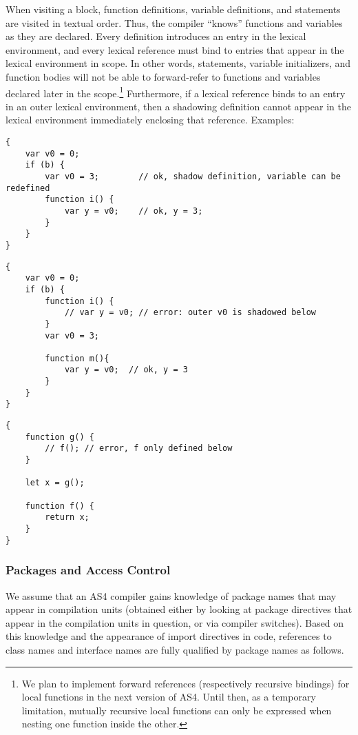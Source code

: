 When visiting a block, function definitions, variable definitions, and statements are visited in textual order. Thus,
the compiler ``knows'' functions and variables as they are declared. Every definition introduces an entry in the lexical
environment, and every lexical reference must bind to entries that appear in the lexical environment in scope.
In other words, statements, variable initializers, and function bodies will not be able to forward-refer to functions
and variables declared later in the scope.\footnote{We plan to implement forward references (respectively recursive
bindings) for local functions in the next version of AS4. Until then, as a temporary limitation, mutually recursive
local functions can only be expressed when nesting one function inside the other.} Furthermore, if a lexical reference
binds to an entry in an outer lexical environment, then a shadowing definition cannot appear in the lexical environment immediately enclosing that
reference.
Examples:
\pagebreak

\begin{minipage}{\linewidth}
\begin{verbatim}
{
    var v0 = 0;
    if (b) {
        var v0 = 3;        // ok, shadow definition, variable can be redefined
        function i() {
            var y = v0;    // ok, y = 3;
        }
    }
}
\end{verbatim}
\end{minipage}

\begin{minipage}{\linewidth}
\begin{verbatim}
{
    var v0 = 0;
    if (b) {
        function i() {
            // var y = v0; // error: outer v0 is shadowed below
        }
        var v0 = 3;

        function m(){
            var y = v0;  // ok, y = 3
        }
    }
}
\end{verbatim}
\end{minipage}

\begin{minipage}{\linewidth}
\begin{verbatim}
{
    function g() {
        // f(); // error, f only defined below
    }

    let x = g();

    function f() {
        return x;
    }
}
\end{verbatim}
\end{minipage}

\subsubsection{Packages and Access Control}
\label{sec:packages-access-controls}
We assume that an AS4 compiler gains knowledge of package names that
  may appear in compilation units (obtained either by looking at package directives that
  appear in the compilation units in question, or via compiler
  switches). Based on this knowledge and the appearance of import
  directives in code, references to class names and interface names
  are fully qualified by package names as follows.

